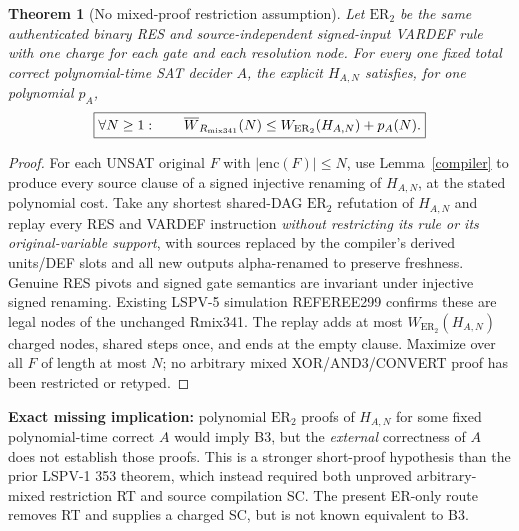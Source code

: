 \documentclass[11pt]{article}
\newtheorem{theorem}{Theorem}
\begin{document}
\begin{theorem}[No mixed-proof restriction assumption]\label{bridge}
Let \(\mathrm{ER}_2\) be the same authenticated binary RES and source-independent signed-input VARDEF rule with one charge for each gate and each resolution node. For every one fixed total correct polynomial-time SAT decider \(A\), the explicit \(H_{A,N}\) satisfies, for one polynomial \(p_A\),
\[
\boxed{\forall N\ge1:\qquad \overline W_{R_{\rm mix341}}(N)
\le W_{\mathrm{ER}_2}(H_{A,N})+p_A(N).}
\]
\end{theorem}
\begin{proof}
For each UNSAT original \(F\) with \(|\mathrm{enc}(F)|\le N\), use Lemma~\ref{compiler} to produce every source clause of a signed injective renaming of \(H_{A,N}\), at the stated polynomial cost. Take any shortest shared-DAG \(\mathrm{ER}_2\) refutation of \(H_{A,N}\) and replay every RES and VARDEF instruction \emph{without restricting its rule or its original-variable support}, with sources replaced by the compiler's derived units/DEF slots and all new outputs alpha-renamed to preserve freshness. Genuine RES pivots and signed gate semantics are invariant under injective signed renaming. Existing LSPV-5 simulation REFEREE299 confirms these are legal nodes of the unchanged Rmix341. The replay adds at most \(W_{\mathrm{ER}_2}(H_{A,N})\) charged nodes, shared steps once, and ends at the empty clause. Maximize over all \(F\) of length at most \(N\); no arbitrary mixed XOR/AND3/CONVERT proof has been restricted or retyped.
\end{proof}

\noindent\textbf{Exact missing implication:} polynomial \(\mathrm{ER}_2\) proofs of \(H_{A,N}\) for some fixed polynomial-time correct \(A\) would imply B3, but the \emph{external} correctness of \(A\) does not establish those proofs. This is a stronger short-proof hypothesis than the prior LSPV-1 353 theorem, which instead required both unproved arbitrary-mixed restriction RT and source compilation SC. The present ER-only route removes RT and supplies a charged SC, but is not known equivalent to B3.
\end{document}
